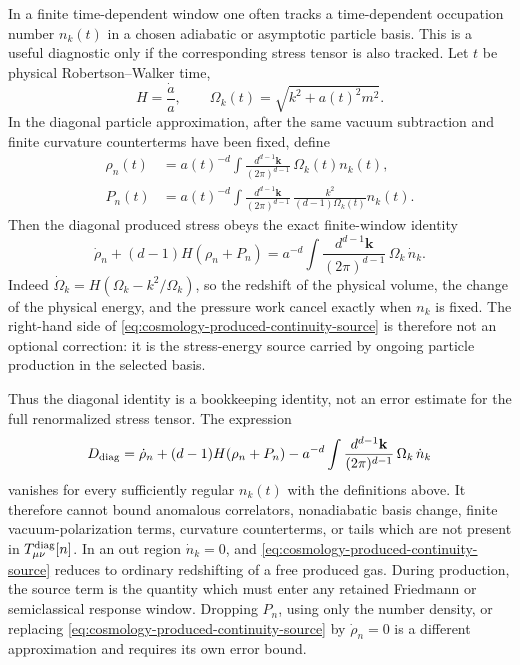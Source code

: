 \begin{proposition}
\label{ca:cosmology-produced-stress-continuity}
In a finite time-dependent window one often tracks a time-dependent
occupation number \(n_k(t)\) in a chosen adiabatic or asymptotic particle
basis.  This is a useful diagnostic only if the corresponding stress tensor
is also tracked.  Let \(t\) be physical Robertson--Walker time,
\[
  H=\frac{\dot a}{a},\qquad
  \Omega_k(t)=\sqrt{k^2+a(t)^2m^2}.
\]
In the diagonal particle approximation, after the same vacuum subtraction and
finite curvature counterterms have been fixed, define
\begin{align}
  \rho_n(t)
  &=
  a(t)^{-d}
  \int
  \frac{d^{d-1}\mathbf k}{(2\pi)^{d-1}}\,
  \Omega_k(t)n_k(t),
  \label{eq:cosmology-produced-time-dependent-rho}
  \\
  P_n(t)
  &=
  a(t)^{-d}
  \int
  \frac{d^{d-1}\mathbf k}{(2\pi)^{d-1}}\,
  \frac{k^2}{(d-1)\Omega_k(t)}n_k(t).
  \label{eq:cosmology-produced-time-dependent-pressure}
\end{align}
Then the diagonal produced stress obeys the exact finite-window identity
\begin{equation}
  \dot\rho_n+(d-1)H(\rho_n+P_n)
  =
  a^{-d}
  \int
  \frac{d^{d-1}\mathbf k}{(2\pi)^{d-1}}\,
  \Omega_k\,\dot n_k .
  \label{eq:cosmology-produced-continuity-source}
\end{equation}
Indeed \(\dot\Omega_k=H(\Omega_k-k^2/\Omega_k)\), so the redshift of the
physical volume, the change of the physical energy, and the pressure work
cancel exactly when \(n_k\) is fixed.  The right-hand side of
\eqref{eq:cosmology-produced-continuity-source} is therefore not an optional
correction: it is the stress-energy source carried by ongoing particle
production in the selected basis.

Thus the diagonal identity is a bookkeeping identity, not an error estimate for
the full renormalized stress tensor.  The expression
\begin{equation}
  D_{\rm diag}
  =
  \dot\rho_n+(d-1)H(\rho_n+P_n)
  -
  a^{-d}
  \int
  \frac{d^{d-1}\mathbf k}{(2\pi)^{d-1}}\,
  \Omega_k\,\dot n_k
  \label{eq:cosmology-produced-diagonal-identity-difference}
\end{equation}
vanishes for every sufficiently regular \(n_k(t)\) with the definitions above.
It therefore cannot bound anomalous correlators, nonadiabatic basis change,
finite vacuum-polarization terms, curvature counterterms, or tails which are
not present in \(T^{\rm diag}_{\mu\nu}[n]\).  In an out region \(\dot n_k=0\),
and
\eqref{eq:cosmology-produced-continuity-source} reduces to ordinary
redshifting of a free produced gas.  During production, the source term is the
quantity which must enter any retained Friedmann or semiclassical response
window.  Dropping \(P_n\), using only the number density, or replacing
\eqref{eq:cosmology-produced-continuity-source} by \(\dot\rho_n=0\) is a
different approximation and requires its own error bound.
\end{proposition}


